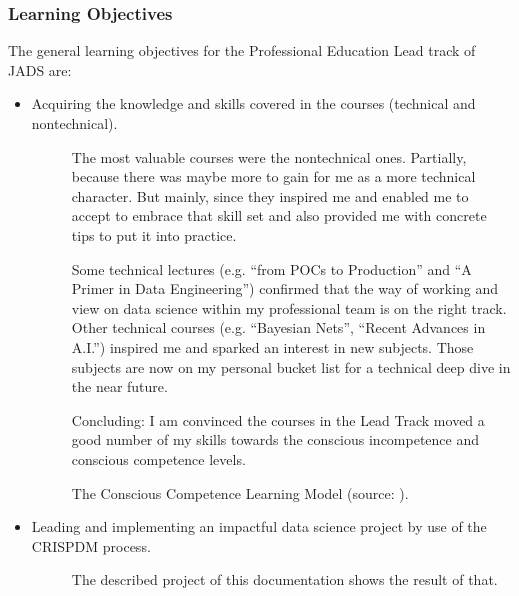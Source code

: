 \documentclass[letterpaper,10pt,english]{sphinxmanual}
\let\sphinxpxdimen\pdfpxdimen\else\newdimen\sphinxpxdimen
\begin{document}
\subsubsection{Learning Objectives}
\label{\detokenize{deployment:learning-objectives}}
The general learning objectives for the Professional Education Lead track of JADS are:
\begin{itemize}
\item {} \begin{description}
\item[{Acquiring the knowledge and skills covered in the courses (technical and non\sphinxhyphen{}technical).}] \leavevmode
The most valuable courses were the non\sphinxhyphen{}technical ones.
Partially, because there was maybe more to gain for me as a more technical character.
But mainly, since they inspired me and enabled me to accept to embrace that skill set and also provided me with concrete tips to put it into practice.

Some technical lectures (e.g. “from POCs to Production” and “A Primer in Data Engineering”) confirmed that the way of working and view on data science within my professional team is on the right track.
Other technical courses (e.g. “Bayesian Nets”, “Recent Advances in A.I.”) inspired me and sparked an interest in new subjects.
Those subjects are now on my personal bucket list for a technical deep dive in the near future.
\begin{description}
\item[{Concluding: I am convinced the courses in the Lead Track moved a good number of my skills towards the conscious incompetence and conscious competence levels.}] \leavevmode
\noindent{\hspace*{\fill}\sphinxincludegraphics[width=800\sphinxpxdimen]{{competence}.png}\hspace*{\fill}}

\end{description}

The Conscious Competence Learning Model (source: ).

\end{description}

\item {} \begin{description}
\item[{Leading and implementing an impactful data science project by use of the CRISP\sphinxhyphen{}DM process.}] \leavevmode
The described project of this documentation shows the result of that.


\end{description}
\end{itemize}
\end{document}
